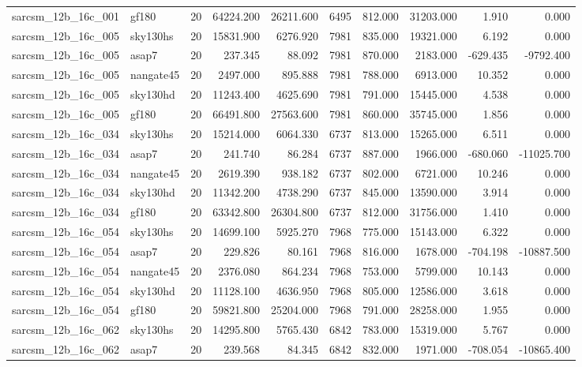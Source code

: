 \documentclass{article}
\begin{document}
\begin{longtable}{llrrrrrrrr}
sarcsm\_12b\_16c\_001 & gf180 & 20 & 64224.200 & 26211.600 & 6495 & 812.000 & 31203.000 & 1.910 & 0.000 \\
sarcsm\_12b\_16c\_005 & sky130hs & 20 & 15831.900 & 6276.920 & 7981 & 835.000 & 19321.000 & 6.192 & 0.000 \\
sarcsm\_12b\_16c\_005 & asap7 & 20 & 237.345 & 88.092 & 7981 & 870.000 & 2183.000 & -629.435 & -9792.400 \\
sarcsm\_12b\_16c\_005 & nangate45 & 20 & 2497.000 & 895.888 & 7981 & 788.000 & 6913.000 & 10.352 & 0.000 \\
sarcsm\_12b\_16c\_005 & sky130hd & 20 & 11243.400 & 4625.690 & 7981 & 791.000 & 15445.000 & 4.538 & 0.000 \\
sarcsm\_12b\_16c\_005 & gf180 & 20 & 66491.800 & 27563.600 & 7981 & 860.000 & 35745.000 & 1.856 & 0.000 \\
sarcsm\_12b\_16c\_034 & sky130hs & 20 & 15214.000 & 6064.330 & 6737 & 813.000 & 15265.000 & 6.511 & 0.000 \\
sarcsm\_12b\_16c\_034 & asap7 & 20 & 241.740 & 86.284 & 6737 & 887.000 & 1966.000 & -680.060 & -11025.700 \\
sarcsm\_12b\_16c\_034 & nangate45 & 20 & 2619.390 & 938.182 & 6737 & 802.000 & 6721.000 & 10.246 & 0.000 \\
sarcsm\_12b\_16c\_034 & sky130hd & 20 & 11342.200 & 4738.290 & 6737 & 845.000 & 13590.000 & 3.914 & 0.000 \\
sarcsm\_12b\_16c\_034 & gf180 & 20 & 63342.800 & 26304.800 & 6737 & 812.000 & 31756.000 & 1.410 & 0.000 \\
sarcsm\_12b\_16c\_054 & sky130hs & 20 & 14699.100 & 5925.270 & 7968 & 775.000 & 15143.000 & 6.322 & 0.000 \\
sarcsm\_12b\_16c\_054 & asap7 & 20 & 229.826 & 80.161 & 7968 & 816.000 & 1678.000 & -704.198 & -10887.500 \\
sarcsm\_12b\_16c\_054 & nangate45 & 20 & 2376.080 & 864.234 & 7968 & 753.000 & 5799.000 & 10.143 & 0.000 \\
sarcsm\_12b\_16c\_054 & sky130hd & 20 & 11128.100 & 4636.950 & 7968 & 805.000 & 12586.000 & 3.618 & 0.000 \\
sarcsm\_12b\_16c\_054 & gf180 & 20 & 59821.800 & 25204.000 & 7968 & 791.000 & 28258.000 & 1.955 & 0.000 \\
sarcsm\_12b\_16c\_062 & sky130hs & 20 & 14295.800 & 5765.430 & 6842 & 783.000 & 15319.000 & 5.767 & 0.000 \\
sarcsm\_12b\_16c\_062 & asap7 & 20 & 239.568 & 84.345 & 6842 & 832.000 & 1971.000 & -708.054 & -10865.400 \\

\end{longtable}
\end{document}
